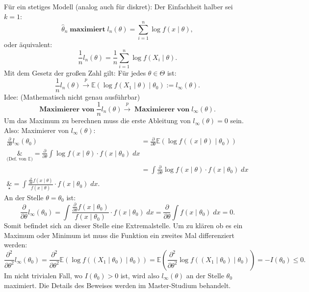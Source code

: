 \documentclass[10pt]{article}
\newcommand{\EW}{\mathbb{E}} %
\newcommand{\KW}{\overset{p} \longrightarrow} %
\newcommand{\xt}{x \mid \theta} %
\newenvironment{BWS}[1][]
{\begin{Beweis}[frametitle=#1]}{\end{Beweis}}
\begin{document}
	\begin{BWS}[Beweisidee 1.3.4 (Konsistenz von ML-Schätzern)]
		Für ein stetiges Modell (analog auch für diskret):
		Der Einfachheit halber sei $k=1$:
		\begin{equation*}
			\hat{\theta}_n \; \textbf{maximiert} \; l_n(\theta) = \sum_{i=1}^{n}\log f(\xt), 
		\end{equation*}
		oder äquivalent:
		\begin{equation*}
			\frac{1}{n} l_n(\theta) = \frac{1}{n}\sum_{i=1}^{n}\log f(X_i \mid \theta).
		\end{equation*}
		Mit dem Gesetz der großen Zahl gilt:
		Für jedes $\theta \in \Theta$ ist:
		\begin{equation*}
			\frac{1}{n} l_n (\theta) \KW \EW(\log f(X_1 \mid \theta) \mid \theta_0) := l_\infty (\theta).
		\end{equation*}
		Idee: (Mathematisch nicht genau ausführbar)
		\begin{equation*}
			\textbf{Maximierer von} \; \frac{1}{n} l_n(\theta) \KW \; \textbf{Maximierer von} \; l_\infty (\theta).
		\end{equation*}
		Um das Maximum zu berechnen muss die erste Ableitung von $l_\infty (\theta) = 0$ sein. Also: Maximierer von $l_\infty (\theta)$:
		\begin{equation*}
			\begin{split}
				\frac{\partial}{\partial \theta} l_\infty (\theta_0) &= \frac{\partial}{\partial \theta} \EW(\log f((x\mid \theta)\mid \theta_0))\\
				\underset{\text{(Def. von $\EW$)}}&{=} \frac{\partial}{\partial \theta} \int \log f(x \mid \theta) \cdot f(x \mid \theta_0) \; dx \\
				&= \int \frac{\partial}{\partial \theta} \log f(x \mid \theta) \cdot f(x\mid \theta_0) \; dx \\
				\underset{\star}&{=}\int \frac{\frac{\partial}{\partial \theta} f(x\mid \theta)}{f(x\mid \theta)} \cdot f(x\mid \theta_0) \; dx. 
			\end{split}
		\end{equation*}
		An der Stelle $\theta = \theta_0$ ist:
		\begin{equation*}
			\frac{\partial}{\partial \theta} l_\infty (\theta_0) = \int \frac{\frac{\partial}{\partial \theta} f(x\mid\theta_0)}{f(x\mid\theta_0)} \cdot f(x\mid\theta_0) \; dx = \frac{\partial}{\partial \theta} \int f(x\mid\theta_0) \; dx = 0.
		\end{equation*}
		Somit befindet sich an dieser Stelle eine Extremalstelle. Um zu klären ob es ein Maximum oder Minimum ist muss die Funktion ein zweites Mal differenziert werden:
		\begin{equation*}
			\frac{\partial^2}{\partial \theta^2} l_\infty(\theta_0) = \frac{\partial^2}{\partial \theta^2} \EW (\log f((X_1 \mid \theta_0) \mid \theta_0)) = \EW \left(\frac{\partial^2}{\partial \theta^2}\log f\left(\left(X_1 \mid \theta_0\right) \mid \theta_0\right)\right) = - I(\theta_0) \leq 0.
		\end{equation*}
		Im nicht trivialen Fall, wo $I(\theta_0) > 0$ ist, wird also $l_\infty (\theta)$ an der Stelle $\theta_0$ maximiert. Die Details des Beweises werden im Master-Studium behandelt. 
	\end{BWS}
	
\end{document}
